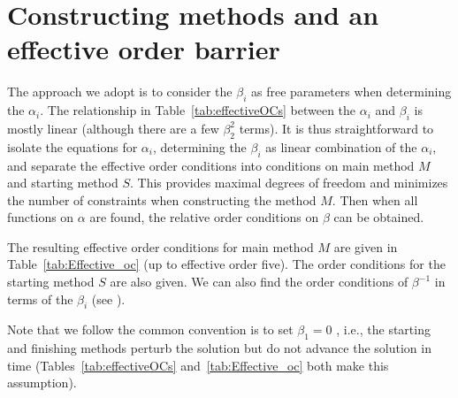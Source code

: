 \section{Constructing methods and an effective order barrier}


The approach we adopt is to consider the $\beta_{i}$ as free
parameters when determining the $\alpha_i$.
The relationship in Table~\ref{tab:effectiveOCs} between the
$\alpha_i$ and $\beta_i$ is mostly linear (although there are a few
$\beta_2^2$ terms).
It is thus straightforward to isolate the equations for $\alpha_i$,
determining the $\beta_i$ as linear combination of the $\alpha_i$, and
separate the effective order conditions into conditions on main method
$M$ and starting method $S$.
This provides maximal degrees of freedom and minimizes the number of
constraints when constructing the method $M$.
Then when all functions on $\alpha$ are found, the relative order
conditions on $\beta$ can be obtained.

The resulting effective order conditions for main method $M$ are given
in Table~\ref{tab:Effective_oc} (up to effective order five).
The order conditions for the starting method $S$ are also given.
We can also find the order conditions of $\beta^{-1}$ in terms of the
$\beta_i$ (see \cite[Table~386(III)]{Butcher2008_book}).

Note that we follow the common convention is to set $\beta_1=0$
\cite{Butcher2008_book}, i.e., the starting and finishing methods
perturb the solution but do not advance the solution in time
(Tables~\ref{tab:effectiveOCs} and~\ref{tab:Effective_oc} both make
this assumption).


